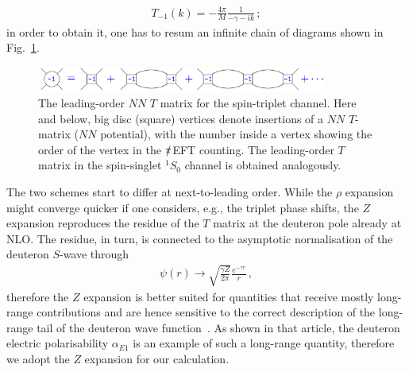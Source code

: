 \documentclass[prl,
twocolumn,
showpacs,preprintnumbers,amsmath,amssymb,
superscriptaddress,
a4paper,nofootinbib,longbibliography]{revtex4-2}
\def\piEFT/{$\slashed{\pi}$EFT}
\begin{document}
\begin{align}
    T_{-1}(k) = -\frac{4\pi}{M}\frac{1}{-\gamma-ik}\,;
\end{align}
in order to obtain it, one has to resum an infinite chain of diagrams shown in Fig.~\ref{fig:MLO}.
\begin{figure}[htb]
    \centering
    \includegraphics[width=0.85\textwidth]{figs/MLO_v1.pdf}
    \caption{The leading-order $NN$ $T$ matrix for the spin-triplet channel. Here and below, big disc (square) vertices denote insertions of a $NN$ $T$-matrix ($NN$ potential), with the number inside a vertex showing the order of the vertex in the \piEFT/ counting. The leading-order $T$ matrix in the spin-singlet ${}^1S_0$ channel is obtained analogously.}
    \label{fig:MLO}
\end{figure}
The two schemes start to differ at next-to-leading order. While the $\rho$ expansion might converge quicker if one considers, e.g., the triplet phase shifts, the $Z$ expansion reproduces the residue of the $T$ matrix at the deuteron pole already at NLO. The residue, in turn,
 is connected to the asymptotic normalisation of the deuteron $S$-wave through
 \begin{align}
 \psi(r)\to \sqrt{\frac{\gamma Z}{2\pi}}\frac{e^{-\gamma r}}{r}\,,
 \end{align}
 therefore the $Z$ expansion is better suited for quantities that receive mostly long-range contributions and are hence sensitive to the correct description of the long-range tail of the deuteron wave function~\cite{Phillips:1999hh}. As shown in that article, the deuteron electric polarisability $\alpha_{E1}$ is an example of such a long-range quantity, therefore we adopt the $Z$ expansion for our calculation.
 
\end{document}
